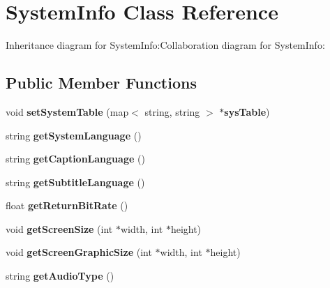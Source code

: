 \section{SystemInfo Class Reference}
\label{classbr_1_1pucrio_1_1telemidia_1_1ginga_1_1core_1_1contextmanager_1_1SystemInfo}
Inheritance diagram for SystemInfo:Collaboration diagram for SystemInfo:\subsection*{Public Member Functions}
\begin{CompactItemize}
\item 
void \textbf{setSystemTable} (map$<$ string, string $>$ $\ast${\bf sysTable})\label{classbr_1_1pucrio_1_1telemidia_1_1ginga_1_1core_1_1contextmanager_1_1SystemInfo_fe2c37138c6bb31dfa1d4f67d95a7152}

\item 
string \textbf{getSystemLanguage} ()\label{classbr_1_1pucrio_1_1telemidia_1_1ginga_1_1core_1_1contextmanager_1_1SystemInfo_1d6c0f603875e7fd53f28ea119e33d0c}

\item 
string \textbf{getCaptionLanguage} ()\label{classbr_1_1pucrio_1_1telemidia_1_1ginga_1_1core_1_1contextmanager_1_1SystemInfo_8a9cf278b1deb3b74a6e3ec90c409667}

\item 
string \textbf{getSubtitleLanguage} ()\label{classbr_1_1pucrio_1_1telemidia_1_1ginga_1_1core_1_1contextmanager_1_1SystemInfo_a26b9d9da53cc8c38ceeaec25167a185}

\item 
float \textbf{getReturnBitRate} ()\label{classbr_1_1pucrio_1_1telemidia_1_1ginga_1_1core_1_1contextmanager_1_1SystemInfo_2e3a73a14f94905299823859e0bed5c7}

\item 
void \textbf{getScreenSize} (int $\ast$width, int $\ast$height)\label{classbr_1_1pucrio_1_1telemidia_1_1ginga_1_1core_1_1contextmanager_1_1SystemInfo_106d1b5758de007ddabca000d27098ad}

\item 
void \textbf{getScreenGraphicSize} (int $\ast$width, int $\ast$height)\label{classbr_1_1pucrio_1_1telemidia_1_1ginga_1_1core_1_1contextmanager_1_1SystemInfo_c62e5213a540b372384c8e574d8fd29e}

\item 
string \textbf{getAudioType} ()\label{classbr_1_1pucrio_1_1telemidia_1_1ginga_1_1core_1_1contextmanager_1_1SystemInfo_a5e339d54eca9b24ae8bcf69d0d0d219}


\end{CompactItemize}
